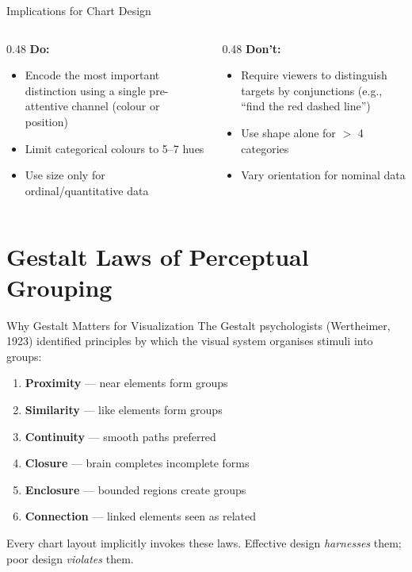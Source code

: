 \documentclass[10pt]{beamer}
\begin{document}
\begin{frame}{Implications for Chart Design}
  \begin{columns}[T]
    \begin{column}{0.48\textwidth}
      \textbf{Do:}
      \begin{itemize}
        \item Encode the most important distinction using a single
              pre-attentive channel (colour or position)
        \item Limit categorical colours to 5--7 hues
        \item Use size only for ordinal/quantitative data
      \end{itemize}
    \end{column}
    \begin{column}{0.48\textwidth}
      \textbf{Don't:}
      \begin{itemize}
        \item Require viewers to distinguish targets by conjunctions
              (e.g., ``find the red dashed line'')
        \item Use shape alone for $>$ 4 categories
        \item Vary orientation for nominal data
      \end{itemize}
    \end{column}
  \end{columns}
\end{frame}

\section{Gestalt Laws of Perceptual Grouping}

\begin{frame}{Why Gestalt Matters for Visualization}
  The Gestalt psychologists (Wertheimer, 1923) identified principles
  by which the visual system organises stimuli into groups:
  \begin{enumerate}
    \item \textbf{Proximity} --- near elements form groups
    \item \textbf{Similarity} --- like elements form groups
    \item \textbf{Continuity} --- smooth paths preferred
    \item \textbf{Closure} --- brain completes incomplete forms
    \item \textbf{Enclosure} --- bounded regions create groups
    \item \textbf{Connection} --- linked elements seen as related
  \end{enumerate}
  \vspace{4pt}
  Every chart layout implicitly invokes these laws.
  Effective design \emph{harnesses} them; poor design \emph{violates} them.
\end{frame}
\end{document}
